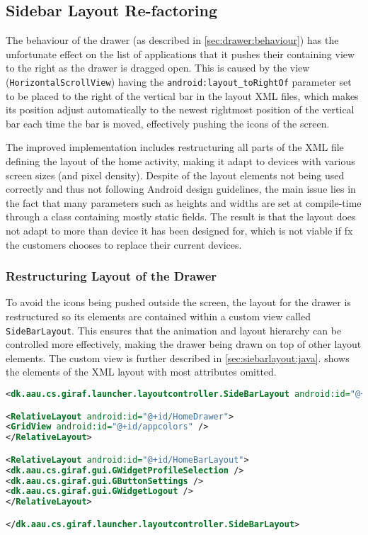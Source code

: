 \subsection{Sidebar Layout Re-factoring}
The behaviour of the drawer (as described in \cref{sec:drawer:behaviour}) has the unfortunate effect on the list of applications that it pushes their containing view to the right as the drawer is dragged open.
This is caused by the view (\lstinline|HorizontalScrollView|) having the  \lstinline{android:layout_toRightOf} parameter set to be placed to the right of the vertical bar in the layout XML files, which makes its position adjust automatically to the newest rightmost position of the vertical bar each time the bar is moved, effectively pushing the icons of the screen.

The improved implementation includes restructuring all parts of the XML file defining the layout of the home activity, making it adapt to devices with various screen sizes (and pixel density).
Despite of the layout elements not being used correctly and thus not following Android design guidelines, the main issue lies in the fact that many parameters such as heights and widths are set at compile-time through a class containing mostly static fields.
The result is that the layout does not adapt to more than device it has been designed for, which is not viable if fx the customers chooses to replace their current devices.

\subsubsection{Restructuring Layout of the Drawer}\label{sec:sidebarlayout:xml}
To avoid the icons being pushed outside the screen, the layout for the drawer is restructured so its elements are contained within a custom view called \lstinline|SideBarLayout|.
This ensures that the animation and layout hierarchy can be controlled more effectively, making the drawer being drawn on top of other layout elements.
The custom view is further described in \cref{sec:siebarlayout:java}.
 shows the elements of the XML layout with most attributes omitted.

\begin{lstlisting}[caption={Structure of the XML layout of the drawer.},label={lst:sidebarlayout}, language=XML]
<dk.aau.cs.giraf.launcher.layoutcontroller.SideBarLayout android:id="@+id/SideBarLayout" android:layout_marginLeft="-400dp">

<RelativeLayout android:id="@+id/HomeDrawer">
<GridView android:id="@+id/appcolors" />
</RelativeLayout>

<RelativeLayout android:id="@+id/HomeBarLayout">
<dk.aau.cs.giraf.gui.GWidgetProfileSelection />
<dk.aau.cs.giraf.gui.GButtonSettings />
<dk.aau.cs.giraf.gui.GWidgetLogout />
</RelativeLayout>

</dk.aau.cs.giraf.launcher.layoutcontroller.SideBarLayout>
\end{lstlisting}

